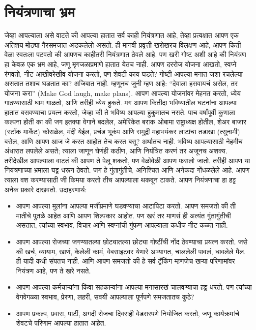 \chapter{नियंत्रणाचा भ्रम}
जेव्हा आपल्याला असे वाटते की आपल्या हातात सर्व काही नियंत्रणात आहे, तेव्हा प्रत्यक्षात आपण एक अतिशय मोठ्या गैरसमजात अडकलेलो असतो. ही मानवी प्रवृत्ती खरोखरच विलक्षण आहे, आपण किती वेळा स्वतःला पटवतो की आपणच काहीतरी नियंत्रणात ठेवले आहे. पण खरी गोष्ट अशी आहे की नियंत्रण हा केवळ एक भ्रम आहे, जणू मृगजळाप्रमाणे हातात येतच नाही.
आपण दररोज योजना आखतो, स्वप्ने रंगवतो, नीट आखीवरेखीव योजना करतो, पण शेवटी काय घडते? गोष्टी आपल्या मनात जशा रचलेल्या असतात तशाच घडतात का? अजिबात नाही. म्हणूनच जुनी म्हण आहे: “देवाला हसवायचं असेल, तर योजना करा” (Make God laugh, make plans). आपण आपल्या योजनांवर मेहनत करतो, ध्येय गाठण्यासाठी घाम गाळतो, आणि तरीही ध्येय हुकते. मग आपण कितीदा भविष्यातील घटनांना आपल्या हातात बसवण्याचा प्रयत्न करतो, जेव्हा की ते भविष्य आपल्या हुकुमातच नसते.
पाच वर्षांपूर्वी कुणाला कल्पना होती का की जग इतक्या वेगाने बदलेल, अमेरिकेत बराक ओबामा राष्ट्राध्यक्ष होतील, शेअर बाजार (स्टॉक मार्केट) कोसळेल, मंदी येईल, प्रचंड भूकंप आणि समुद्री महाभयंकर लाटांचा तडाखा (त्सुनामी) बसेल, आणि आपण आज जे करत आहोत तेच करत बसू? अर्थातच नाही. भविष्य आपल्यासाठी नेहमीच अंधारात लपलेले असते; त्याला जाणून घेणंही कठीण, आणि नियंत्रित करणं तर अजूनच अशक्य. तरीदेखील आपल्याला वाटतं की आपण ते पेलू शकतो, पण वेळोवेळी आपण फसलो जातो.
तरीही आपण या नियंत्रणाच्या भ्रमाला घट्ट धरून ठेवतो. जग हे गुंतागुंतीचे, अनिश्चित आणि अनेकदा गोंधळलेले आहे. आपण त्याला वश करण्यासाठी जी किमया करतो तीच आपल्याला थकवून टाकते.
आपण नियंत्रणाचा हा हट्ट अनेक प्रकारे दाखवतो. उदाहरणार्थ:
\begin{itemize}
\item आपण आपल्या मुलांना आपल्या मर्जीप्रमाणे घडवण्याचा आटापिटा करतो. आपण समजतो की ती मातीचे पुतळे आहेत आणि आपण शिल्पकार आहोत. पण खरं तर माणसं ही अत्यंत गुंतागुंतीची असतात, त्यांच्या स्वभाव, विचार आणि स्वप्नांची गुंफण आपल्याला कधीच नीट कळत नाही.
\item आपण आपल्या रोजच्या जगण्यातल्या छोट्यातल्या छोट्या गोष्टींची नोंद ठेवण्याचा प्रयत्न करतो. जसे की खर्च, व्यायाम, खाणं, केलेली कामं, वेबसाइटवर येणारे अभ्यागत, चाललेली पावलं, धावलेले मैल. ही यादी कधी संपतच नाही. आणि आपण समजतो की हे सर्व ट्रॅकिंग म्हणजेच खऱ्या परिणामांवर नियंत्रण आहे, पण ते खरे नसते.
\item आपण आपल्या कर्मचाऱ्यांना किंवा सहकाऱ्यांना आपल्या मनासारखं चालवण्याचा हट्ट धरतो. पण त्यांच्या वेगवेगळ्या स्वभाव, प्रेरणा, लहरी, सवयी आपल्याला पूर्णपणे समजतातच कुठे?
\item आपण प्रकल्प, प्रवास, पार्टी, अगदी रोजचा दिवसही वेडसरपणे नियोजित करतो, जणू कार्यक्रमांचे शेवटचे परिणाम आपल्या हातात आहेत.
\end{itemize}
